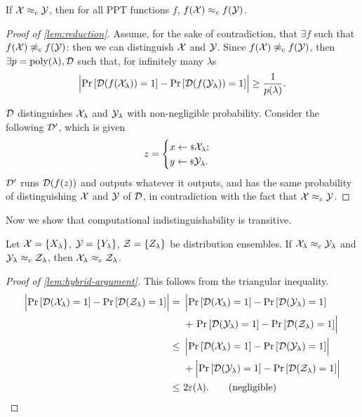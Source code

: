 \begin{lemma}[Reduction] \label{lem:reduction}
	If $\mathcal{X} \approx_c \mathcal{Y}$, then for all \ac{PPT} functions $f$, $f(\mathcal{X}) \approx_c f(\mathcal{Y})$.
\end{lemma}

\begin{proof}[Proof of \cref{lem:reduction}]
	Assume, for the sake of contradiction, that $\exists f$ such that $f(\mathcal{X}) \not \approx_c f(\mathcal{Y})$: then we can distinguish $\mathcal{X}$ and $\mathcal{Y}$.
	Since $f(\mathcal{X}) \not \approx_c f(\mathcal{Y})$, then $\exists p = \mathrm{poly}(\lambda), \mathcal{D}$ such that, for infinitely many $\lambda$s
	\begin{equation*}
		\left|{\mathop{\mathrm{Pr}}\limits_{} \left[ {\mathcal{D}(f(\mathcal{X}_{\lambda})) = 1} \right] - \mathop{\mathrm{Pr}}\limits_{} \left[ {\mathcal{D}(f(\mathcal{Y}_{\lambda})) = 1} \right]}\right| \ge \frac{1}{p(\lambda)}.
	\end{equation*}

	$\mathcal{D}$ distinguishes $\mathcal{X}_{\lambda}$ and $\mathcal{Y}_{\lambda}$ with non-negligible probability.
	Consider the following $\mathcal{D}'$, which is given
	\begin{equation*}
		z =
		\begin{cases}
			x \leftarrow {\scriptstyle \$} {\mathcal{X}_{\lambda}}; \\
			y \leftarrow {\scriptstyle \$} {\mathcal{Y}_{\lambda}}. \\
		\end{cases}
	\end{equation*}
	$\mathcal{D}'$ runs $\mathcal{D}(f(z))$ and outputs whatever it outputs, and has the same probability of distinguishing $\mathcal{X}$ and $\mathcal{Y}$ of $\mathcal{D}$, in contradiction with the fact that $\mathcal{X} \approx_c \mathcal{Y}$.
\end{proof}

Now we show that computational indistinguishability is transitive.

\begin{lemma} \label{lem:hybrid-argument}
	Let $\mathcal{X} = \{X_{\lambda}\}$, $\mathcal{Y} = \{ Y_{\lambda} \}$, $\mathcal{Z} = \{ Z_{\lambda} \}$ be distribution ensembles.
	If $\mathcal{X}_{\lambda} \approx_c \mathcal{Y}_{\lambda}$ and $\mathcal{Y}_{\lambda} \approx_c \mathcal{Z}_{\lambda}$, then $\mathcal{X}_{\lambda} \approx_c \mathcal{Z}_{\lambda}$.
\end{lemma}

\begin{proof}[Proof of \cref{lem:hybrid-argument}]
	This follows from the triangular inequality.
	\begin{align*}
		\left|{\mathop{\mathrm{Pr}}\limits_{} \left[ {\mathcal{D}(\mathcal{X}_{\lambda}) = 1} \right] - \mathop{\mathrm{Pr}}\limits_{} \left[ {\mathcal{D}(\mathcal{Z}_{\lambda}) = 1} \right]}\right|
		= &~
		\left| \mathop{\mathrm{Pr}}\limits_{} \left[ {\mathcal{D}(\mathcal{X}_{\lambda}) = 1} \right] - \mathop{\mathrm{Pr}}\limits_{} \left[ {\mathcal{D}(\mathcal{Y}_{\lambda}) = 1} \right] \right.
		\\
		&~+
		\left. \mathop{\mathrm{Pr}}\limits_{} \left[ {\mathcal{D}(\mathcal{Y}_{\lambda}) = 1} \right] - \mathop{\mathrm{Pr}}\limits_{} \left[ {\mathcal{D}(\mathcal{Z}_{\lambda}) = 1} \right] \right|
		\\
		\le &~
		\left|{\mathop{\mathrm{Pr}}\limits_{} \left[ {\mathcal{D}(\mathcal{X}_{\lambda}) = 1} \right] - \mathop{\mathrm{Pr}}\limits_{} \left[ {\mathcal{D}(\mathcal{Y}_{\lambda}) = 1} \right]}\right|
		\\
		&~+
		\left|{\mathop{\mathrm{Pr}}\limits_{} \left[ {\mathcal{D}(\mathcal{Y}_{\lambda}) = 1} \right] - \mathop{\mathrm{Pr}}\limits_{} \left[ {\mathcal{D}(\mathcal{Z}_{\lambda}) = 1} \right]}\right|
		\\
		\le &~2 \varepsilon(\lambda). \tag{negligible}
	\end{align*}
\end{proof}

